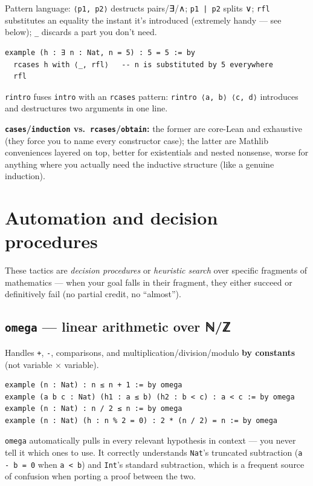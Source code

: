 Pattern language: \texttt{⟨p1, p2⟩} destructs pairs/∃/∧; \texttt{p1 | p2} splits ∨; \texttt{rfl} substitutes an equality the instant it's introduced (extremely handy --- see below); \texttt{\_} discards a part you don't need.

\begin{verbatim}
example (h : ∃ n : Nat, n = 5) : 5 = 5 := by
  rcases h with ⟨_, rfl⟩   -- n is substituted by 5 everywhere
  rfl
\end{verbatim}

\texttt{rintro} fuses \texttt{intro} with an \texttt{rcases} pattern: \texttt{rintro ⟨a, b⟩ ⟨c, d⟩} introduces and destructures two arguments in one line.

\textbf{\texttt{cases}/\texttt{induction} vs.\ \texttt{rcases}/\texttt{obtain}:} the former are core-Lean and exhaustive (they force you to name every constructor case); the latter are Mathlib conveniences layered on top, better for existentials and nested nonsense, worse for anything where you actually need the inductive structure (like a genuine induction).

\section{Automation and decision procedures}

These tactics are \emph{decision procedures} or \emph{heuristic search} over specific fragments of mathematics --- when your goal falls in their fragment, they either succeed or definitively fail (no partial credit, no ``almost'').

\subsection{\texttt{omega} --- linear arithmetic over ℕ/ℤ}

Handles \texttt{+}, \texttt{-}, comparisons, and multiplication/division/modulo \textbf{by constants} (not variable × variable).

\begin{verbatim}
example (n : Nat) : n ≤ n + 1 := by omega
example (a b c : Nat) (h1 : a ≤ b) (h2 : b < c) : a < c := by omega
example (n : Nat) : n / 2 ≤ n := by omega
example (n : Nat) (h : n % 2 = 0) : 2 * (n / 2) = n := by omega
\end{verbatim}

\texttt{omega} automatically pulls in every relevant hypothesis in context --- you never tell it which ones to use. It correctly understands \texttt{Nat}'s truncated subtraction (\texttt{a - b = 0} when \texttt{a < b}) and \texttt{Int}'s standard subtraction, which is a frequent source of confusion when porting a proof between the two.

